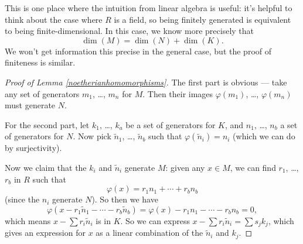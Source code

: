 \begin{note}
    This is one place where the intuition from linear algebra is useful: it's helpful to think about the case where $R$ is a field, so being finitely generated is equivalent to being finite-dimensional. In this case, we know more precisely that \[\dim(M) = \dim(N) + \dim(K).\] We won't get information this precise in the general case, but the proof of finiteness is similar. 
\end{note}

\begin{proof}[Proof of Lemma \ref{noetherianhomomorphisms}]
    The first part is obvious --- take any set of generators $m_1$, \ldots, $m_n$ for $M$. Then their images $\varphi(m_1)$, \ldots, $\varphi(m_n)$ must generate $N$. 

    For the second part, let $k_1$, \ldots, $k_a$ be a set of generators for $K$, and $n_1$, \ldots, $n_b$ a set of generators for $N$. Now pick $\tilde{n}_1$, \ldots, $\tilde{n}_b$ such that $\varphi(\tilde{n}_i) = n_i$ (which we can do by surjectivity). 

    Now we claim that the $k_i$ and $\tilde{n}_i$ generate $M$: given any $x \in M$, we can find $r_1$, \ldots, $r_b$ in $R$ such that \[\varphi(x) = r_1n_1 + \cdots + r_bn_b\] (since the $n_i$ generate $N$). So then we have \[\varphi(x - r_1\tilde{n}_1 - \cdots - r_b\tilde{n}_b) = \varphi(x) - r_1n_1 - \cdots - r_bn_b = 0,\] which means $x - \sum r_i\tilde{n}_i$ is in $K$. So we can express $x - \sum r_i\tilde{n}_i = \sum s_jk_j$, which gives an expression for $x$ as a linear combination of the $\tilde{n}_i$ and $k_j$. 
\end{proof}

